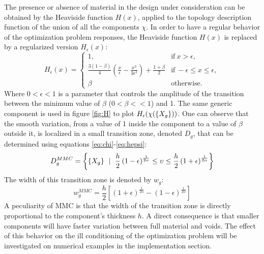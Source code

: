 The presence or absence of material in the design under consideration can be obtained by the Heaviside function $H(x)$, applied to the topology description function of the union of all the components $\chi$. In order to have a regular behavior of the optimization problem responses, the Heaviside function $H(x)$ is replaced by a regularized version $H_{\epsilon}(x)$:
\begin{equation}
\label{eq:hepsi}
    H_{\epsilon}(x)=\begin{cases}
    1, & \text{if}\  x > \epsilon,\\
    \frac{3(1-\beta)}{4}\left(\frac{x}{\epsilon}-\frac{x^3}{3\epsilon^3}\right)+\frac{1+\beta}{2} & \text{if}\  -\epsilon\leq x\leq \epsilon,\\
    \beta & \text{otherwise}.
    \end{cases}
\end{equation}
Where $0<\epsilon<1$ is a parameter that controls the amplitude of the transition between the minimum value of $\beta$  ($0<\beta<<1$) and 1. The same generic component is used in figure \ref{fig:H} to plot $H_{\epsilon}(\chi(\left\{{X_g}\right\}))$. One can observe that the smooth variation, from a value of 1 inside the component to a value of $\beta$  outside it, is localized in a small transition zone, denoted $D_g$, that can be determined using equations \eqref{eq:chi}-\eqref{eq:hepsi}:
\begin{equation}
D_g^{MMC}=\left\lbrace \left\{{X_g}\right\}\ \mid \  \frac{h}{2}\left(1-\epsilon\right)^{\frac{1}{2\alpha}}\leq \upsilon \leq  \frac{h}{2}\left(1+\epsilon\right)^{\frac{1}{2\alpha}}\right\rbrace    
\end{equation}
The width of this transition zone is denoted by $w_g$:
\begin{equation}
    w_g^{MMC}=\frac{h}{2}\left[\left(1+\epsilon\right)^{\frac{1}{2\alpha}}-\left(1-\epsilon\right)^{\frac{1}{2\alpha}}\right]
\end{equation}
A peculiarity of MMC is that the width of the transition zone is directly proportional to the component's thickness $h$. A direct consequence is that smaller components will have faster variation between full material and voids. The effect of this behavior on the ill conditioning of the optimization problem will be investigated on numerical examples in the implementation section.

